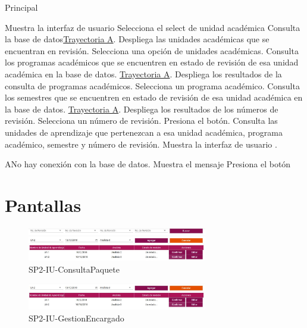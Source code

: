 \begin{UCtrayectoria}{Principal}


    \UCpaso Muestra la interfaz de usuario 
    \UCpaso [\UCactor] Selecciona el select de unidad académica
    \UCpaso Consulta la base de datos\hyperref[SP2-CU5-A]{Trayectoria A}.
    \UCpaso Despliega las unidades académicas que se encuentran en revisión.
    \UCpaso [\UCactor] Selecciona una opción de unidades académicas.
    \UCpaso Consulta los programas académicos que se encuentren en estado de revisión de esa unidad académica en la base de datos. \hyperref[SP2-CU5-A]{Trayectoria A}.
    \UCpaso Despliega los resultados de la consulta de programas académicos.
    \UCpaso [\UCactor] Selecciona un programa académico.
    \UCpaso Consulta los semestres que se encuentren en estado de revisión de esa unidad académica en la base de datos. \hyperref[SP2-CU5-A]{Trayectoria A}.
    \UCpaso Despliega los resultados de los números de revisión.
    \UCpaso [\UCactor] Selecciona un número de revisión.
    \UCpaso [\UCactor] Presiona el botón. 
    \UCpaso Consulta las unidades de aprendizaje que pertenezcan a esa unidad académica, programa académico, semestre y número de revisión.
    \UCpaso Muestra la interfaz de usuario .

\end{UCtrayectoria}


\label{SP2-CU5-A}
\begin{UCtrayectoriaA}{A}{No hay conexión con la base de datos.}
    \UCpaso Muestra el mensaje 
    \UCpaso[\UCactor] Presiona el botón 
\end{UCtrayectoriaA}

\chapter{Pantallas}
 \begin{figure}
  \centering
    \includegraphics[width=0.7\textwidth]{DCU/SP2/Pantallas/ConsultaPaquete}
  \caption{SP2-IU-ConsultaPaquete}
  \label{SP2-IU-ConsultaPaquete}
\end{figure}

 \begin{figure}
  \centering
    \includegraphics[width=0.7\textwidth]{DCU/SP2/Pantallas/GestionEncargado}
  \caption{SP2-IU-GestionEncargado}
  \label{SP2-IU-GestionEncargado}
\end{figure}



